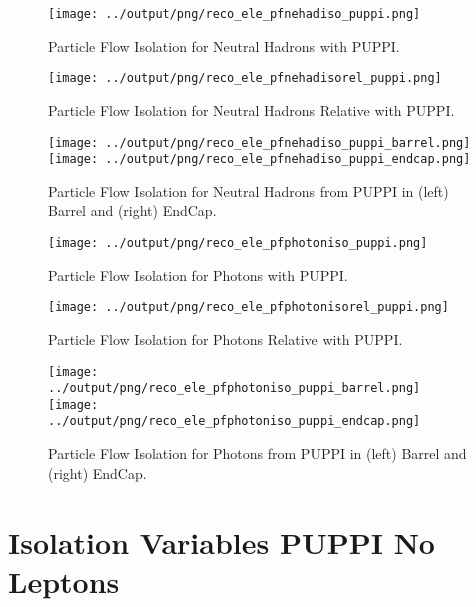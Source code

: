 \documentclass[11pt]{book}
\begin{document}
\begin{figure}[htb]
\centering
\texttt{[image: ../output/png/reco\_ele\_pfnehadiso\_puppi.png]}
\caption{Particle Flow Isolation for Neutral Hadrons with PUPPI.}
\label{fig:reco_ele_pfnehadiso_puppi}
\end{figure}

\begin{figure}[htb]
\centering
\texttt{[image: ../output/png/reco\_ele\_pfnehadisorel\_puppi.png]}
\caption{Particle Flow Isolation for Neutral Hadrons Relative with PUPPI.}
\label{fig:reco_ele_pfnehadisorel_puppi}
\end{figure}

\begin{figure}[ht]
\centering
\texttt{[image: ../output/png/reco\_ele\_pfnehadiso\_puppi\_barrel.png]}
\texttt{[image: ../output/png/reco\_ele\_pfnehadiso\_puppi\_endcap.png]}
\caption{Particle Flow Isolation for Neutral Hadrons from PUPPI in (left) Barrel and (right) EndCap.}
\label{fig:reco_ele_pfnehadiso_puppi_regions}
\end{figure}

\begin{figure}[htb]
\centering
\texttt{[image: ../output/png/reco\_ele\_pfphotoniso\_puppi.png]}
\caption{Particle Flow Isolation for Photons with PUPPI.}
\label{fig:reco_ele_pfphotoniso_puppi}
\end{figure}

\begin{figure}[htb]
\centering
\texttt{[image: ../output/png/reco\_ele\_pfphotonisorel\_puppi.png]}
\caption{Particle Flow Isolation for Photons Relative with PUPPI.}
\label{fig:reco_ele_pfphotonisorel_puppi}
\end{figure}

\begin{figure}[ht]
\centering
\texttt{[image: ../output/png/reco\_ele\_pfphotoniso\_puppi\_barrel.png]}
\texttt{[image: ../output/png/reco\_ele\_pfphotoniso\_puppi\_endcap.png]}
\caption{Particle Flow Isolation for Photons from PUPPI in (left) Barrel and (right) EndCap.}
\label{fig:reco_ele_pfphotoniso_puppi_regions}
\end{figure}

\clearpage


\section{Isolation Variables PUPPI No Leptons}
\end{document}
